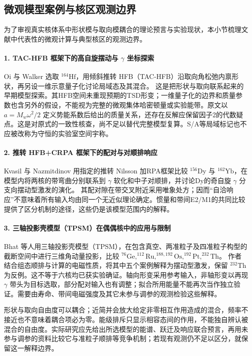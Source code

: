 \subsection{微观模型案例与核区观测边界}\label{sec:3-6-6}

为了审视真实核体系中形状模与取向模耦合的理论预言与实验现状，本小节梳理文献中代表性的微观计算与典型核区的观测边界。

\paragraph{1. TAC-HFB 框架下的高自旋摆动与 $\gamma$ 坐标探索}
Oi 与 Walker 选取 $^{164}\mathrm{Hf}$，用倾斜推转 HFB（TAC-HFB）沿取向角松弛内禀形状，再另设一维示意量子化讨论局域态及其混合。\cite{doctoral-r1-g37-oi-2001-wobbling-gamma-coupling} 这是把形状与取向联系起来的早期模型探索。其HFB空间未重现预期的TSD形变；一维量子化的边界和质量参数也含另外的假设，不能视为完整的微观集体哈密顿量或实验能带。原文以 $a=M_w\omega^2/2$ 定义势能系数后给出的质量关系，还存在反解应保留因子2的代数疑点。这是对原式的一致性核查，尚不足以替代完整模型复算。S/A等局域标记也不应被改称为守恒的实验室空间宇称。

\paragraph{2. 推转 HFB+CRPA 框架下的配对与对顺排响应}
Kvasil 与 Nazmitdinov 用指定的推转 Nilsson 加RPA框架比较 $^{156}\mathrm{Dy}$ 与 $^{162}\mathrm{Yb}$，在模型内将两核的带弯曲分别联系到 $\gamma$ 软化和中子对顺排，并讨论Dy的奇自旋 $\gamma$ 分支向摆动型激发的演化。\cite{kvasil-2006-dy156-yb162-crpa-wobbling} 其配对隙在带交叉附近采用唯象处方；因而“自洽响应”不意味着所有输入均由同一个无近似理论确定。惯量和带间E2/M1的共同比较提供了区分机制的途径，这些仍是该模型范围内的解释。

\paragraph{3. 三轴投影壳模型（TPSM）在偶偶核中的应用与限制}
Bhat 等人用三轴投影壳模型（TPSM），在包含真空、两准粒子及四准粒子构型的截断空间中进行三维角动量投影，比较 $^{76}\mathrm{Ge}, ^{112}\mathrm{Ru}, ^{188,192}\mathrm{Os}, ^{192}\mathrm{Pt}, ^{232}\mathrm{Th}$。\cite{doctoral-r1-g37-bhat-2025-microscopic-wobbling-even-even} 作者结合组态顺排与计算的电磁性质，将其中五个案例解释为摆动型激发，保留 $^{232}\mathrm{Th}$ 为反例。这不等于六核均已获实验确证。轴向形变采用参考输入，非轴形变以再现 $\gamma$ 带头为目标选取，部分配对输入也有调整；拟合所用能量不能再次当作独立验证。需要由寿命、带间电磁强度及其它未参与调参的观测检验这些解释。

形状与取向自由度可以耦合；近简并会放大给定非零相互作用造成的混合，频率不接近也不意味着耦合项必为零。能级排斥只显示相容态间的作用，不能独自辨认被混合的自由度。实际研究应先给出所选模型的能谱、跃迁及响应联合预言，再用未参与调参的资料比较它与准粒子顺排等竞争机制；若现有观测仍不足以区分，就保留这一解释边界。
